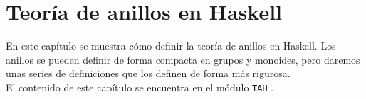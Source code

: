 \chapter{Teoría de anillos en Haskell}\label{sec:anillosHas}

En este capítulo se muestra cómo definir la teoría de anillos en Haskell. Los anillos se pueden definir de forma compacta en grupos y monoides, pero daremos unas series de definiciones que los definen de forma más rigurosa.\\




El contenido de este capítulo se encuentra en el módulo \texttt{TAH} 
.

